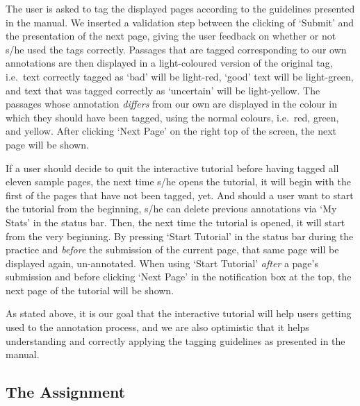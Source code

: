 \documentclass[12pt,a4paper]{article}
\begin{document}
The user is asked to tag the displayed pages according to the guidelines presented in the manual. 
We inserted a validation step between the clicking of `Submit' and the presentation of the next page, giving the user feedback on whether or not s/he used the tags correctly. 
Passages that are tagged corresponding to our own annotations are then displayed in a light-coloured version of the original tag, i.e.~text correctly tagged as `bad' will be light-red, `good' text will be light-green, and text that was tagged correctly as `uncertain' will be light-yellow.
The passages whose annotation \textit{differs} from our own are displayed in the colour in which they should have been tagged, using the normal colours, i.e.~red, green, and yellow. After clicking `Next Page' on the right top of the screen, the next page will be shown.

If a user should decide to quit the interactive tutorial before having tagged all eleven sample pages, the next time s/he opens the tutorial, it will begin with the first of the pages that have not been tagged, yet. 
And should a user want to start the tutorial from the beginning, s/he can delete previous annotations via `My Stats' in the status bar. 
Then, the next time the tutorial is opened, it will start from the very beginning. 
By pressing `Start Tutorial' in the status bar during the practice and \textit{before} the submission of the current page, that same page will be displayed again, un-annotated. 
When using `Start Tutorial' \textit{after} a page's submission and before clicking `Next Page' in the notification box at the top, the next page of the tutorial will be shown.

As stated above, it is our goal that the interactive tutorial will help users getting used to the annotation process, and we are also optimistic that it helps understanding and correctly applying the tagging guidelines as presented in the manual.


\subsection{The Assignment}
\end{document}
